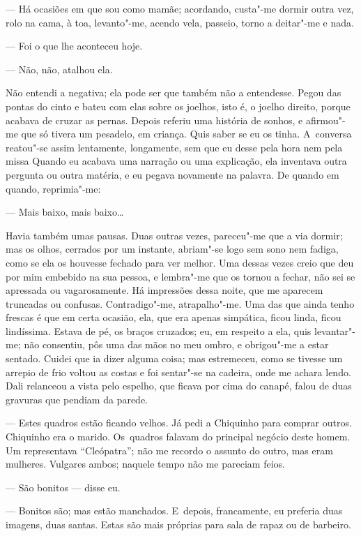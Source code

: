\begin{linenumbers}
--- Há ocasiões em que sou como mamãe; acordando, custa"-me dormir outra
vez, rolo na cama, à toa, levanto"-me, acendo vela, passeio, torno a
deitar"-me e nada.

--- Foi o que lhe aconteceu hoje.

--- Não, não, atalhou ela.

Não entendi a negativa; ela pode ser que também não a entendesse. Pegou
das pontas do cinto e bateu com elas sobre os joelhos, isto é, o joelho
direito, porque acabava de cruzar as pernas. Depois referiu uma história
de sonhos, e afirmou"-me que só tivera um pesadelo, em criança. Quis
saber se eu os tinha. A~conversa reatou"-se assim lentamente, longamente,
sem que eu desse pela hora nem pela missa Quando eu acabava uma narração
ou uma explicação, ela inventava outra pergunta ou outra matéria, e eu
pegava novamente na palavra. De quando em quando, reprimia"-me:

--- Mais baixo, mais baixo\ldots{}

Havia também umas pausas. Duas outras vezes, pareceu"-me que a via
dormir; mas os olhos, cerrados por um instante, abriam"-se logo sem sono
nem fadiga, como se ela os houvesse fechado para ver melhor. Uma dessas
vezes creio que deu por mim embebido na sua pessoa, e lembra"-me que os
tornou a fechar, não sei se apressada ou vagarosamente. Há impressões
dessa noite, que me aparecem truncadas ou confusas. Contradigo"-me,
atrapalho"-me. Uma das que ainda tenho frescas é que em certa ocasião,
ela, que era apenas simpática, ficou linda, ficou lindíssima. Estava de
pé, os braços cruzados; eu, em respeito a ela, quis levantar"-me; não
consentiu, pôs uma das mãos no meu ombro, e obrigou"-me a estar sentado.
Cuidei que ia dizer alguma coisa; mas estremeceu, como se tivesse um
arrepio de frio voltou as costas e foi sentar"-se na cadeira, onde me
achara lendo. Dali relanceou a vista pelo espelho, que ficava por cima
do canapé, falou de duas gravuras que pendiam da parede.

--- Estes quadros estão ficando velhos. Já pedi a Chiquinho para comprar
outros. Chiquinho era o marido. Os~quadros falavam do principal negócio
deste homem. Um representava ``Cleópatra''; não me recordo o assunto do
outro, mas eram mulheres. Vulgares ambos; naquele tempo não me pareciam
feios.

--- São bonitos --- disse eu.

--- Bonitos são; mas estão manchados. E~depois, francamente, eu preferia
duas imagens, duas santas. Estas são mais próprias para sala de rapaz ou
de barbeiro.


\end{linenumbers}
